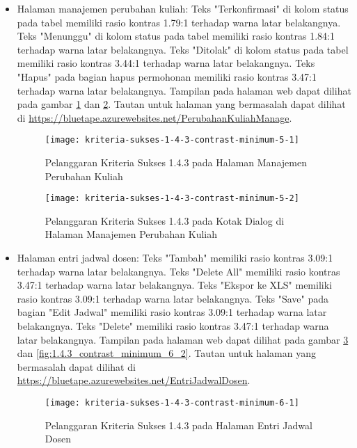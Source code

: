\begin{itemize}
    \item Halaman manajemen perubahan kuliah: Teks "Terkonfirmasi" di kolom status pada tabel memiliki rasio kontras 1.79:1 terhadap warna latar belakangnya. Teks "Menunggu" di kolom status pada tabel memiliki rasio kontras 1.84:1 terhadap warna latar belakangnya. Teks "Ditolak" di kolom status pada tabel memiliki rasio kontras 3.44:1 terhadap warna latar belakangnya. Teks "Hapus" pada bagian hapus permohonan memiliki rasio kontras 3.47:1 terhadap warna latar belakangnya. Tampilan pada halaman web dapat dilihat pada gambar \ref{fig:1.4.3_contrast_minimum_5_1} dan \ref{fig:1.4.3_contrast_minimum_5_2}. Tautan untuk halaman yang bermasalah dapat dilihat di \url{https://bluetape.azurewebsites.net/PerubahanKuliahManage}.
    \begin{figure}[H]
        \centering  
        \texttt{[image: kriteria-sukses-1-4-3-contrast-minimum-5-1]}  
        \caption[Pelanggaran Kriteria Sukses 1.4.3 pada Halaman Manajemen Perubahan Kuliah]{Pelanggaran Kriteria Sukses 1.4.3 pada Halaman Manajemen Perubahan Kuliah}
        \label{fig:1.4.3_contrast_minimum_5_1}
    \end{figure} 
    
    \begin{figure}[H]
        \centering  
        \texttt{[image: kriteria-sukses-1-4-3-contrast-minimum-5-2]}  
        \caption[Pelanggaran Kriteria Sukses 1.4.3 pada Kotak Dialog di Halaman Manajemen Perubahan Kuliah]{Pelanggaran Kriteria Sukses 1.4.3 pada Kotak Dialog di Halaman Manajemen Perubahan Kuliah}
        \label{fig:1.4.3_contrast_minimum_5_2}
    \end{figure} 

    \item Halaman entri jadwal dosen: Teks "Tambah" memiliki rasio kontras 3.09:1 terhadap warna latar belakangnya. Teks "Delete All" memiliki rasio kontras 3.47:1 terhadap warna latar belakangnya. Teks "Ekspor ke XLS" memiliki rasio kontras 3.09:1 terhadap warna latar belakangnya. Teks "Save" pada bagian "Edit Jadwal" memiliki rasio kontras 3.09:1 terhadap warna latar belakangnya. Teks "Delete" memiliki rasio kontras 3.47:1 terhadap warna latar belakangnya. Tampilan pada halaman web dapat dilihat pada gambar \ref{fig:1.4.3_contrast_minimum_6_1} dan \ref{fig:1.4.3_contrast_minimum_6_2}. Tautan untuk halaman yang bermasalah dapat dilihat di \url{https://bluetape.azurewebsites.net/EntriJadwalDosen}.	
    \begin{figure}[H]
        \centering  
        \texttt{[image: kriteria-sukses-1-4-3-contrast-minimum-6-1]}  
        \caption[Pelanggaran Kriteria Sukses 1.4.3 pada Halaman Entri Jadwal Dosen]{Pelanggaran Kriteria Sukses 1.4.3 pada Halaman Entri Jadwal Dosen}
        \label{fig:1.4.3_contrast_minimum_6_1}  
    \end{figure} 
    

\end{itemize}
